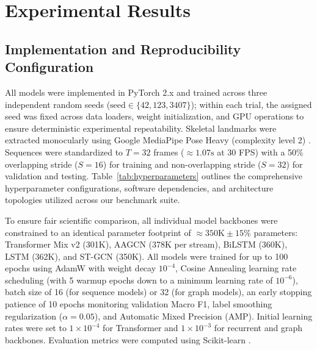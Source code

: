 \documentclass[preprint,12pt]{elsarticle}
\begin{document}
\section{Experimental Results}

\subsection{Implementation and Reproducibility Configuration}
All models were implemented in PyTorch 2.x \cite{paszke2019} and trained across three independent random seeds ($\text{seed} \in \{42, 123, 3407\}$); within each trial, the assigned seed was fixed across data loaders, weight initialization, and GPU operations to ensure deterministic experimental repeatability. Skeletal landmarks were extracted monocularly using Google MediaPipe Pose Heavy (complexity level 2) \cite{chuankun2019,bazarevsky2020}. Sequences were standardized to $T=32$ frames ($\approx 1.07\text{s}$ at 30 FPS) with a 50\% overlapping stride ($S=16$) for training and non-overlapping stride ($S=32$) for validation and testing. Table~\ref{tab:hyperparameters} outlines the comprehensive hyperparameter configurations, software dependencies, and architecture topologies utilized across our benchmark suite.

To ensure fair scientific comparison, all individual model backbones were constrained to an identical parameter footprint of $\approx 350\text{K} \pm 15\%$ parameters: Transformer Mix v2 (301K), AAGCN (378K per stream), BiLSTM (360K), LSTM (362K), and ST-GCN (350K). All models were trained for up to 100 epochs using AdamW \cite{loshchilov2018} with weight decay $10^{-4}$, Cosine Annealing learning rate scheduling (with 5 warmup epochs down to a minimum learning rate of $10^{-6}$), batch size of 16 (for sequence models) or 32 (for graph models), an early stopping patience of 10 epochs monitoring validation Macro F1, label smoothing regularization \cite{szegedy2016} ($\alpha = 0.05$), and Automatic Mixed Precision (AMP). Initial learning rates were set to $1 \times 10^{-4}$ for Transformer and $1 \times 10^{-3}$ for recurrent and graph backbones. Evaluation metrics were computed using Scikit-learn \cite{pedregosa2011}.
\end{document}
